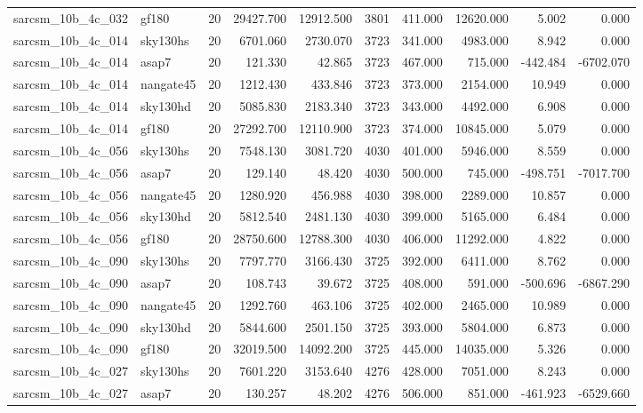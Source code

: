 \begin{tabular}{llrrrrrrrr}
sarcsm\_10b\_4c\_032 & gf180 & 20 & 29427.700 & 12912.500 & 3801 & 411.000 & 12620.000 & 5.002 & 0.000 \\
sarcsm\_10b\_4c\_014 & sky130hs & 20 & 6701.060 & 2730.070 & 3723 & 341.000 & 4983.000 & 8.942 & 0.000 \\
sarcsm\_10b\_4c\_014 & asap7 & 20 & 121.330 & 42.865 & 3723 & 467.000 & 715.000 & -442.484 & -6702.070 \\
sarcsm\_10b\_4c\_014 & nangate45 & 20 & 1212.430 & 433.846 & 3723 & 373.000 & 2154.000 & 10.949 & 0.000 \\
sarcsm\_10b\_4c\_014 & sky130hd & 20 & 5085.830 & 2183.340 & 3723 & 343.000 & 4492.000 & 6.908 & 0.000 \\
sarcsm\_10b\_4c\_014 & gf180 & 20 & 27292.700 & 12110.900 & 3723 & 374.000 & 10845.000 & 5.079 & 0.000 \\
sarcsm\_10b\_4c\_056 & sky130hs & 20 & 7548.130 & 3081.720 & 4030 & 401.000 & 5946.000 & 8.559 & 0.000 \\
sarcsm\_10b\_4c\_056 & asap7 & 20 & 129.140 & 48.420 & 4030 & 500.000 & 745.000 & -498.751 & -7017.700 \\
sarcsm\_10b\_4c\_056 & nangate45 & 20 & 1280.920 & 456.988 & 4030 & 398.000 & 2289.000 & 10.857 & 0.000 \\
sarcsm\_10b\_4c\_056 & sky130hd & 20 & 5812.540 & 2481.130 & 4030 & 399.000 & 5165.000 & 6.484 & 0.000 \\
sarcsm\_10b\_4c\_056 & gf180 & 20 & 28750.600 & 12788.300 & 4030 & 406.000 & 11292.000 & 4.822 & 0.000 \\
sarcsm\_10b\_4c\_090 & sky130hs & 20 & 7797.770 & 3166.430 & 3725 & 392.000 & 6411.000 & 8.762 & 0.000 \\
sarcsm\_10b\_4c\_090 & asap7 & 20 & 108.743 & 39.672 & 3725 & 408.000 & 591.000 & -500.696 & -6867.290 \\
sarcsm\_10b\_4c\_090 & nangate45 & 20 & 1292.760 & 463.106 & 3725 & 402.000 & 2465.000 & 10.989 & 0.000 \\
sarcsm\_10b\_4c\_090 & sky130hd & 20 & 5844.600 & 2501.150 & 3725 & 393.000 & 5804.000 & 6.873 & 0.000 \\
sarcsm\_10b\_4c\_090 & gf180 & 20 & 32019.500 & 14092.200 & 3725 & 445.000 & 14035.000 & 5.326 & 0.000 \\
sarcsm\_10b\_4c\_027 & sky130hs & 20 & 7601.220 & 3153.640 & 4276 & 428.000 & 7051.000 & 8.243 & 0.000 \\
sarcsm\_10b\_4c\_027 & asap7 & 20 & 130.257 & 48.202 & 4276 & 506.000 & 851.000 & -461.923 & -6529.660 \\

\end{tabular}
